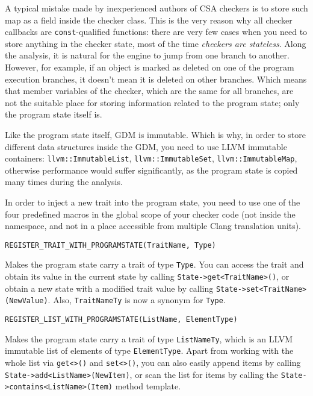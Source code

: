 \documentclass[a4paper,12pt]{article}
\newenvironment{nobr}{\begin{minipage}{\textwidth}\setlength\parskip{1em}
}{\end{minipage}\ignorespacesafterend}
\begin{document}
A typical mistake made by inexperienced authors of CSA checkers is to store such map as a field inside the checker class. This is the very reason why all checker callbacks are \lstinline|const|-qualified functions: there are very few cases when you need to store anything in the checker state, most of the time \emph{checkers are stateless}. Along the analysis, it is natural for the engine to jump from one branch to another. However, for example, if an object is marked as deleted on one of the program execution branches, it doesn't mean it is deleted on other branches. Which means that member variables of the checker, which are the same for all branches, are not the suitable place for storing information related to the program state; only the program state itself is.

Like the program state itself, GDM is immutable. Which is why, in order to store different data structures inside the GDM, you need to use LLVM immutable containers: \lstinline|llvm::ImmutableList|, \lstinline|llvm::ImmutableSet|, \lstinline|llvm::ImmutableMap|, otherwise performance would suffer significantly, as the program state is copied many times during the analysis.

In order to inject a new trait into the program state, you need to use one of the four predefined macros in the global scope of your checker code (not inside the namespace, and not in a place accessible from multiple Clang translation units).

\begin{nobr}
\begin{lstlisting}[style=cplusplus,numbers=none]
REGISTER_TRAIT_WITH_PROGRAMSTATE(TraitName, Type)
\end{lstlisting}

Makes the program state carry a trait of type \lstinline|Type|. You can access the trait and obtain its value in the current state by calling \lstinline|State->get<TraitName>()|, or obtain a new state with a modified trait value by calling \lstinline|State->set<TraitName>(NewValue)|. Also, \lstinline|TraitNameTy| is now a synonym for \lstinline|Type|.
\end{nobr}

\begin{nobr}
\begin{lstlisting}[style=cplusplus,numbers=none]
REGISTER_LIST_WITH_PROGRAMSTATE(ListName, ElementType)
\end{lstlisting}

Makes the program state carry a trait of type \lstinline|ListNameTy|, which is an LLVM immutable list of elements of type \lstinline|ElementType|. Apart from working with the whole list via \lstinline|get<>()| and \lstinline|set<>()|, you can also easily append items by calling \lstinline|State->add<ListName>(NewItem)|, or scan the list for items by calling the \lstinline|State->contains<ListName>(Item)| method template.
\end{nobr}
\end{document}
